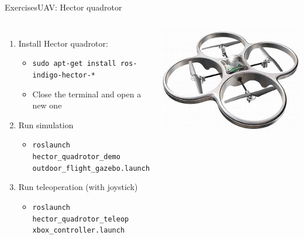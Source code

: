 \documentclass[10pt,compress]{beamer} %
\begin{document}
\begin{frame}{Exercises}{UAV: Hector quadrotor}
	\begin{columns}
	\begin{enumerate}
		\item Install Hector quadrotor: 
			\begin{itemize}
			\item \texttt{sudo apt-get install ros-indigo-hector-*}
			\item Close the terminal and open a new one
			\end{itemize}
		\item Run simulation
			\begin{itemize}
			\item \texttt{roslaunch hector\_quadrotor\_demo outdoor\_flight\_gazebo.launch}
			\end{itemize}
		\item Run teleoperation (with joystick)
			\begin{itemize}
			\item \texttt{roslaunch hector\_quadrotor\_teleop xbox\_controller.launch}
			\end{itemize}
	\end{enumerate}
		\centering\includegraphics[width=\linewidth]{figs/quad.jpg}
	\end{columns}
\end{frame}
\end{document}
